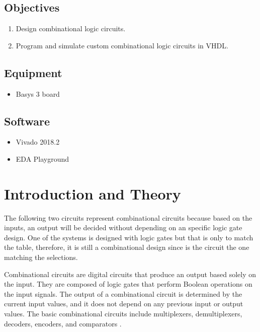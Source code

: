 \documentclass{article}
\begin{document}
\begin{multicols}{2}

	\subsection*{Objectives}\label{Objectives}

	\begin{enumerate}
		\item Design combinational logic circuits.
		\item Program and simulate custom combinational logic circuits in VHDL.
	\end{enumerate}

	\subsection*{Equipment}\label{Equipment}

	\begin{itemize}
		\item Basys 3 board
	\end{itemize}

	\subsection*{Software}\label{Software}

	\begin{itemize}
		\item Vivado 2018.2
		\item EDA Playground
	\end{itemize}

	\section*{Introduction and Theory}\label{Introduction}
	The following two circuits represent combinational circuits because based on the inputs, an output will be decided without depending on an specific logic gate design. One of the systems is designed with logic gates but that is only to match the table, therefore, it is still a combinational design since is the circuit the one matching the selections.

	Combinational circuits are digital circuits that produce an output based solely on the input. They are composed of logic gates that perform Boolean operations on the input signals. The output of a combinational circuit is determined by the current input values, and it does not depend on any previous input or output values. The basic combinational circuits include multiplexers, demultiplexers, decoders, encoders, and comparators \cite{floyd_digital_2023}.


\end{multicols}
\end{document}
